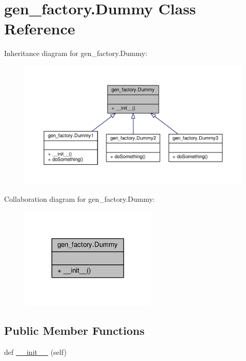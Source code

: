 \hypertarget{classgen__factory_1_1_dummy}{}\section{gen\+\_\+factory.\+Dummy Class Reference}
\label{classgen__factory_1_1_dummy}


Inheritance diagram for gen\+\_\+factory.\+Dummy\+:
\nopagebreak
\begin{figure}[H]
\begin{center}
\leavevmode
\includegraphics[width=350pt]{classgen__factory_1_1_dummy__inherit__graph}
\end{center}
\end{figure}


Collaboration diagram for gen\+\_\+factory.\+Dummy\+:
\nopagebreak
\begin{figure}[H]
\begin{center}
\leavevmode
\includegraphics[width=185pt]{classgen__factory_1_1_dummy__coll__graph}
\end{center}
\end{figure}
\subsection*{Public Member Functions}
\begin{DoxyCompactItemize}
\item 
def \hyperlink{classgen__factory_1_1_dummy_aed8c66d829aedd98a5b1bed80725ffab}{\+\_\+\+\_\+init\+\_\+\+\_\+} (self)
\end{DoxyCompactItemize}


